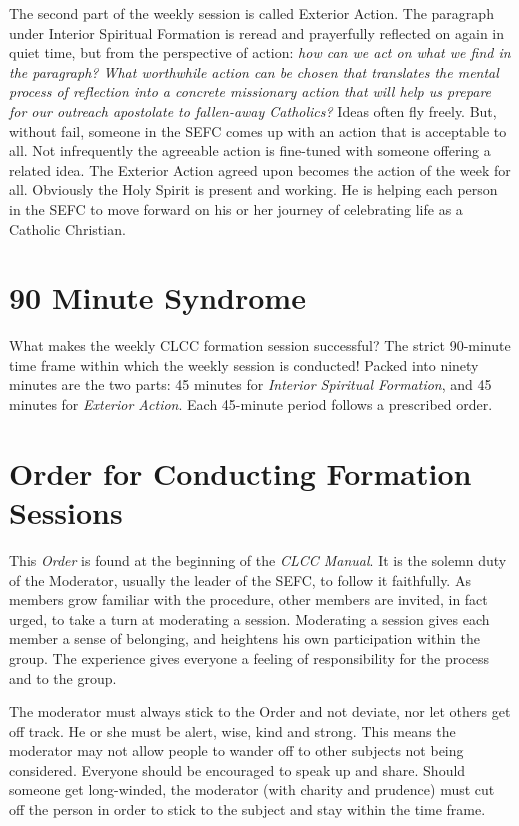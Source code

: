 \documentclass{article}
\begin{document}
The second part of the weekly session is called Exterior Action. The paragraph
under Interior Spiritual Formation is reread and prayerfully reflected on again
in quiet time, but from the perspective of action: \emph{how can we act on what
we find in the paragraph? What worthwhile action can be chosen that translates
the mental process of reflection into a concrete missionary action that will
help us prepare for our outreach apostolate to fallen-away Catholics?} Ideas
often fly freely. But, without fail, someone in the SEFC comes up with an action
that is acceptable to all. Not infrequently the agreeable action is fine-tuned
with someone offering a related idea. The Exterior Action agreed upon becomes
the action of the week for all. Obviously the Holy Spirit is present and
working. He is helping each person in the SEFC to move forward on his or her
journey of celebrating life as a Catholic Christian.


\section{90 Minute Syndrome}

What makes the weekly CLCC formation session successful? The strict 90-minute
time frame within which the weekly session is conducted! Packed into ninety
minutes are the two parts: 45 minutes for \emph{Interior Spiritual Formation},
and 45 minutes for \emph{Exterior Action}. Each 45-minute period follows a
prescribed order.


\section{Order for Conducting Formation Sessions}

This \emph{Order} is found at the beginning of the \emph{CLCC Manual}. It is the
solemn duty of the Moderator, usually the leader of the SEFC, to follow it
faithfully. As members grow familiar with the procedure, other members are
invited, in fact urged, to take a turn at moderating a session. Moderating a
session gives each member a sense of belonging, and heightens his own
participation within the group. The experience gives everyone a feeling of
responsibility for the process and to the group.

The moderator must always stick to the Order and not deviate, nor let others get
off track. He or she must be alert, wise, kind and strong. This means the
moderator may not allow people to wander off to other subjects not being
considered. Everyone should be encouraged to speak up and share. Should someone
get long-winded, the moderator (with charity and prudence) must cut off the
person in order to stick to the subject and stay within the time frame.
\end{document}
